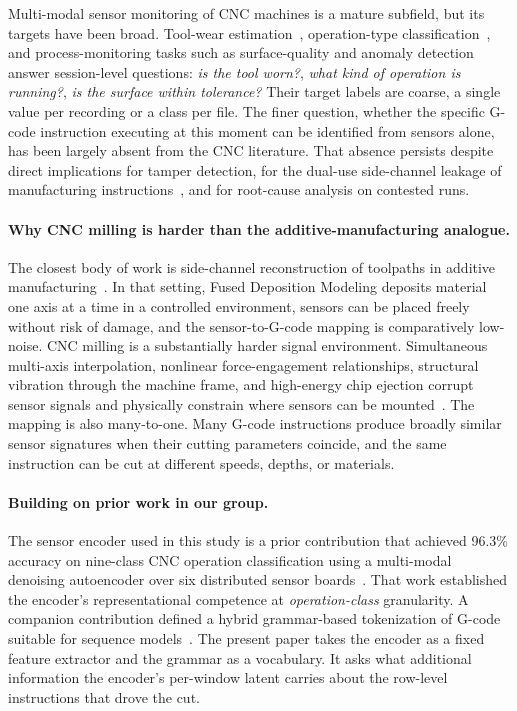 \documentclass[sensors,article,submit,moreauthors,pdftex]{Definitions/mdpi}
\begin{document}
Multi-modal sensor monitoring of CNC machines is a mature subfield, but its targets have been broad. Tool-wear estimation~\cite{teti2010advanced,serin2020tool,zhu2009wavelet,mohanraj2020tool,wang2024multisensor}, operation-type classification~\cite{wang2018deep,zhao2019machine}, and process-monitoring tasks such as surface-quality and anomaly detection~\cite{stathatos2024cnn,coelho2024anomaly} answer session-level questions: \emph{is the tool worn?}, \emph{what kind of operation is running?}, \emph{is the surface within tolerance?} Their target labels are coarse, a single value per recording or a class per file. The finer question, whether the specific G-code instruction executing at this moment can be identified from sensors alone, has been largely absent from the CNC literature. That absence persists despite direct implications for tamper detection, for the dual-use side-channel leakage of manufacturing instructions~\cite{alfaruque2016acoustic,song2016my,chhetri2016kcad,chhetri2017confidentiality,jamarani2024screg,chattopadhyay2025video}, and for root-cause analysis on contested runs.

\paragraph{Why CNC milling is harder than the additive-manufacturing analogue.} The closest body of work is side-channel reconstruction of toolpaths in additive manufacturing~\cite{alfaruque2016acoustic,song2016my,chhetri2016kcad}. In that setting, Fused Deposition Modeling deposits material one axis at a time in a controlled environment, sensors can be placed freely without risk of damage, and the sensor-to-G-code mapping is comparatively low-noise. CNC milling is a substantially harder signal environment. Simultaneous multi-axis interpolation, nonlinear force-engagement relationships, structural vibration through the machine frame, and high-energy chip ejection corrupt sensor signals and physically constrain where sensors can be mounted~\cite{teti2010advanced,wang2018deep}. The mapping is also many-to-one. Many G-code instructions produce broadly similar sensor signatures when their cutting parameters coincide, and the same instruction can be cut at different speeds, depths, or materials.

\paragraph{Building on prior work in our group.} The sensor encoder used in this study is a prior contribution that achieved 96.3\% accuracy on nine-class CNC operation classification using a multi-modal denoising autoencoder over six distributed sensor boards~\cite{encoder_paper}. That work established the encoder's representational competence at \emph{operation-class} granularity. A companion contribution defined a hybrid grammar-based tokenization of G-code suitable for sequence models~\cite{grammar_paper}. The present paper takes the encoder as a fixed feature extractor and the grammar as a vocabulary. It asks what additional information the encoder's per-window latent carries about the row-level instructions that drove the cut.
\end{document}
